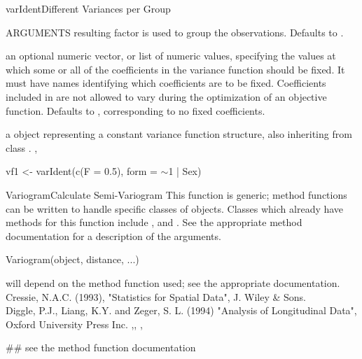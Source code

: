 \documentclass[pdftex]{article} \usepackage{url,graphicx}
\renewcommand{\Twiddle}{\mbox{\(\sim\)}}
\begin{document}
\begin{Helpfile}{varIdent}{Different Variances per Group}
\begin{Argument}{ARGUMENTS}
  resulting factor is used to group the observations. Defaults to
  \Co{\Twiddle 1}.
\item[\Co{fixed:}]
an optional numeric vector, or list of numeric values,
specifying the values at which some or all of the  coefficients in
the variance function should be fixed. It must have names
identifying which coefficients are to be fixed. Coefficients
included in  are not allowed to vary during the
optimization of an objective function. Defaults to ,
corresponding to no fixed coefficients.
\end{Argument}
a  object representing a constant variance function
structure, also inheriting from class .
, 
\need 15pt
\vspace{-16pt} 
\begin{Example}
vf1 <- varIdent(c(F = 0.5), form = \Twiddle 1 | Sex)
\end{Example}
\end{Helpfile}
\begin{Helpfile}{Variogram}{Calculate Semi-Variogram}
This function is generic; method functions can be written to handle
specific classes of objects. Classes which already have methods for
this function include ,  and . See
the appropriate method documentation for a description of the
arguments.
\begin{Example}
Variogram(object, distance, ...)
\end{Example}
will depend on the method function used; see the appropriate documentation.
Cressie, N.A.C. (1993), "Statistics for Spatial Data", J. Wiley \& Sons.\\
Diggle, P.J., Liang, K.Y. and Zeger, S. L. (1994) "Analysis of
Longitudinal Data", Oxford University Press Inc. 
,,
, 
\need 15pt
\vspace{-16pt}
\begin{Example}
## see the method function documentation
\end{Example}
\end{Helpfile}
\end{document}
